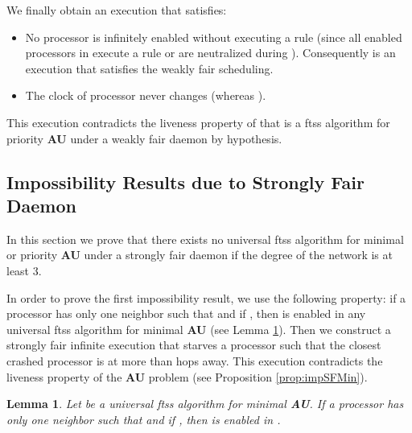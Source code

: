 \documentclass[11pt,english,letterpaper]{article}
\newtheorem{lemma}{Lemma}
\newenvironment{proof}{{\noindent\bf Proof. } }{{\hfill }}
\begin{document}
\begin{proof}
We finally obtain an execution  that satisfies:

\begin{itemize}
\item No processor is infinitely enabled without executing a rule (since all enabled processors in  execute a rule or are neutralized during ). Consequently  is an execution that satisfies the  weakly fair scheduling.
\item The clock of processor  never changes (whereas ).
\end{itemize}

This execution contradicts the liveness property of  that is a ftss algorithm for priority \textbf{AU} under a weakly fair daemon by hypothesis. 
\end{proof}

\subsection{Impossibility Results due to Strongly Fair Daemon}

In this section we prove that there exists no universal ftss algorithm for minimal or priority \textbf{AU} under a strongly fair daemon if the degree of the network is at least 3. 

In order to prove the first impossibility result, we use the following property: if a processor  has only one neighbor  such that 	and if , then  is enabled in any universal ftss algorithm for minimal \textbf{AU} (see Lemma \ref{lem:impSFMin}). Then we construct a strongly fair infinite execution that starves a processor such that the closest crashed processor is at more than  hops away. This execution contradicts the liveness property of the \textbf{AU} problem (see Proposition \ref{prop:impSFMin}).

\begin{lemma}\label{lem:impSFMin}
Let  be a universal ftss algorithm for minimal \textbf{AU}. If a processor  has only one neighbor  such that  and if , then  is enabled in . 
\end{lemma}
\end{document}
